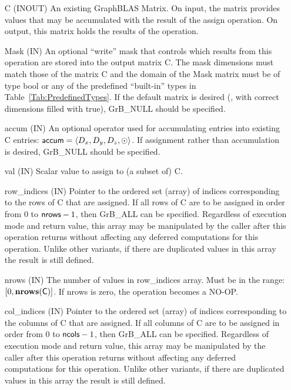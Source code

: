 \begin{itemize}[leftmargin=1.1in]
    \item[{\sf C}]    ({\sf INOUT}) An existing GraphBLAS Matrix.  On input,
    the matrix provides values that may be accumulated with the result of the
    assign operation.  On output, this matrix holds the results of the
    operation.

    \item[{\sf Mask}] ({\sf IN}) An optional ``write'' mask that controls which
    results from this operation are stored into the output matrix {\sf C}. The 
    mask dimensions must match those of the matrix {\sf C} and the domain of the 
    {\sf Mask} matrix must be of type {\sf bool} or any of the predefined 
    ``built-in'' types in Table~\ref{Tab:PredefinedTypes}.  If the default
    matrix is desired (\ie, with correct dimensions filled with {\sf true}), 
    {\sf GrB\_NULL} should be specified.

    \item[{\sf accum}]    ({\sf IN}) An optional operator used for accumulating
    entries into existing {\sf C} entries: ${\sf accum} = \langle D_x,
    D_y, D_z,\odot \rangle$. If assignment rather than accumulation is
    desired, {\sf GrB\_NULL} should be specified.

    \item[{\sf val}]    ({\sf IN}) Scalar value to assign to (a subset of) {\sf C}.
    
    \item[{\sf row\_indices}]  ({\sf IN}) Pointer to the ordered set (array) of 
    indices corresponding to the rows of {\sf C} that are assigned.  If all rows
    of {\sf C} are to be assigned in order from $0$ to ${\sf nrows} - 1$, then 
    {\sf GrB\_ALL} can be specified.  Regardless of execution mode and return 
    value, this array may be manipulated by the caller after this operation 
    returns without affecting any deferred computations for this operation.  
    Unlike other variants, if there are duplicated values in this array the 
    result is still defined.

    \item[{\sf nrows}] ({\sf IN}) The number of values in {\sf row\_indices} 
	array. Must be in the range: $[0, \bold{nrows}({\sf C})]$.  If
    {\sf nrows} is zero, the operation becomes a NO-OP.

    \item[{\sf col\_indices}]  ({\sf IN}) Pointer to the ordered set (array) of 
    indices corresponding to the columns of {\sf C} that are assigned.  If all columns
    of {\sf C} are to be assigned in order from $0$ to ${\sf ncols} - 1$, then 
    {\sf GrB\_ALL} can be specified.  Regardless of execution mode and return 
    value, this array may be manipulated by the caller after this operation 
    returns without affecting any deferred computations for this operation.
    Unlike other variants, if there are duplicated values in this array the 
    result is still defined.


\end{itemize}
